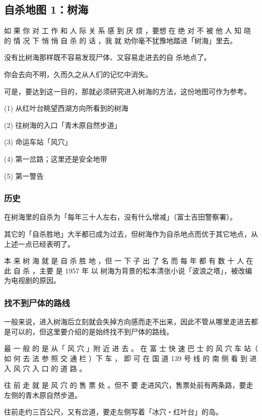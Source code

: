 \documentclass[UTF8]{ctexart}
\begin{document}
\subsection{自杀地图 1：树海}

如 果 你 对 工 作 和 人 际 关 系 感 到 厌 烦 ，要想 在 绝 对 不 被 他 人 知 晓 的 情 况 下 悄 悄 自 杀 的 话 ，我 就 劝你毫不犹豫地踏进「树海」里去。

没有比树海那样既不容易发现尸体、又容易走进去的自 杀地点了。 

你会去向不明，久而久之从人们的记忆中消失。

可是，要达到这一目的，那就必须研究进入树海的方法，这份地图可作为参考。

(1) 从红叶台眺望西湖方向所看到的树海

(2) 往树海的入口「青木原自然步道」

(3) 命运车站「风穴」

(4) 第一岔路；这里还是安全地带

(5) 第一警告

\subsubsection{历史}

在树海里的自杀为「每年三十人左右，没有什么增减」（富士吉田警察署）。

其它的「自杀胜地」大半都已成为过去，但树海作为自杀地点而优于其它地点，从上述一点已经表明了。

本 来 树 海 就 是 自 杀 胜 地 ，但 一 下 子 出 了 名 而 每 年 都 有 数 十 人 在 此 自 杀 ，主要 是 1957 年 以 树海为背景的松本清张小说「波浪之塔」，被改编为电视剧的原因。

\subsubsection*{找不到尸体的路线}

一般来说，进入树海后立刻就会失掉方向感而走不出来，因此不管从哪里走进去都是可以的，但这里要介绍的是始终找不到尸体的路线。

最 一 般 的 是 从「 风 穴 」附 近 进 去 。
在 富 士 快 速 巴 士 的 风 穴 车 站（ 如 何 去 法 参 照 交 通 栏 ）下 车 ， 即 可 在 国 道 139 号 线 的 南 侧 看 到 进 入 风 穴 入 口 的 道 路 。

往 前 走 就 是 风 穴 的 售 票 处 。但不 要 走进风穴，售票处前有两条路，要走左侧的青木原自然步道。 

往前走约三百公尺，又有岔道，要走左侧写着「冰穴‧红叶台」的岛。
\end{document}
